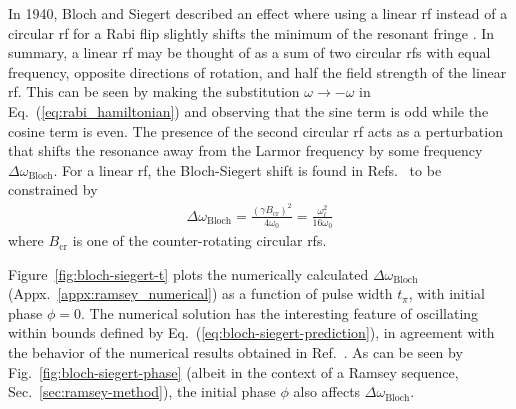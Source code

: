 
In 1940, Bloch and Siegert described an effect where using a linear \acrshort*{rf} instead of a circular \acrshort*{rf} for a Rabi flip slightly shifts the minimum of the resonant fringe \cite{bloch_magnetic_1940}. In summary, a linear \acrshort*{rf} may be thought of as a sum of two circular \acrshort*{rf}s with equal frequency, opposite directions of rotation, and half the field strength of the linear \acrshort*{rf}. This can be seen by making the substitution $\omega \rightarrow -\omega$ in Eq.~(\ref{eq:rabi_hamiltonian}) and observing that the sine term is odd while the cosine term is even. The presence of the second circular \acrshort*{rf} acts as a perturbation that shifts the resonance away from the Larmor frequency by some frequency $\Delta\omega_\text{Bloch}$. For a linear \acrshort*{rf}, the Bloch-Siegert shift is found in Refs.~\cite{bloch_magnetic_1940, ramsey_resonance_1955} to be constrained by
%
\begin{gather}
    \Delta\omega_\text{Bloch}= \frac{(\gamma B_\text{cr})^2}{4\omega_0} = \frac{\omega_\ell^2}{16\omega_0}\label{eq:bloch-siegert-prediction}
\end{gather}
%
where $B_\text{cr}$ is one of the counter-rotating circular \acrshort*{rf}s. 

Figure~\ref{fig:bloch-siegert-t} plots the numerically calculated $\Delta\omega_\text{Bloch}$ (Appx.~\ref{appx:ramsey_numerical}) as a function of pulse width $t_\pi$, with initial phase $\phi=0$. The numerical solution has the interesting feature of oscillating within bounds defined by Eq.~(\ref{eq:bloch-siegert-prediction}), in agreement with the behavior of the numerical results obtained in Ref.~\cite{may_thesis}. As can be seen by Fig.~\ref{fig:bloch-siegert-phase} (albeit in the context of a Ramsey sequence, Sec.~\ref{sec:ramsey-method}), the initial phase $\phi$ also affects $\Delta\omega_\text{Bloch}$.

